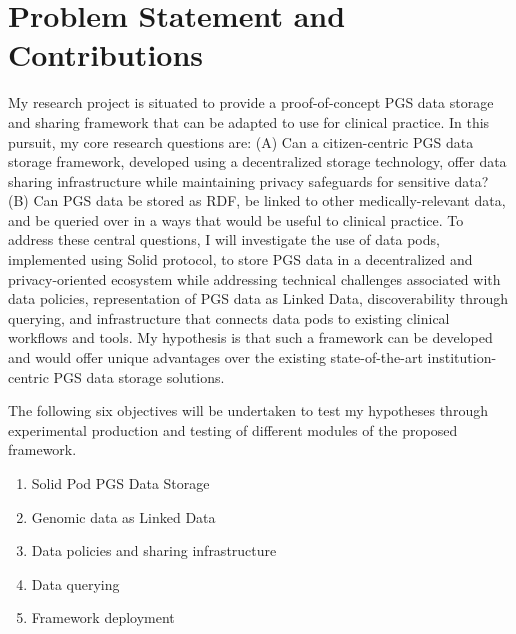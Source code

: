 \documentclass[runningheads]{llncs}
\begin{document}


\section{Problem Statement and Contributions}

My research project is situated to provide a proof-of-concept PGS data storage and sharing framework that can be adapted to use for clinical practice. 
In this pursuit, my core research questions are: 
(A) Can a citizen-centric PGS data storage framework, developed using a decentralized storage technology, offer data sharing infrastructure while maintaining privacy safeguards for sensitive data? 
(B) Can PGS data be stored as RDF, be linked to other medically-relevant data, and be queried over in a ways that would be useful to clinical practice.
To address these central questions, I will investigate the use of data pods, implemented using Solid protocol, to store PGS data in a decentralized and privacy-oriented ecosystem while addressing technical challenges associated with data policies, representation of PGS data as Linked Data, discoverability through querying, and infrastructure that connects data pods to existing clinical workflows and tools. 
My hypothesis is that such a framework can be developed and would offer unique advantages over the existing state-of-the-art institution-centric PGS data storage solutions. 

The following six objectives will be undertaken to test my hypotheses through experimental production and testing of different modules of the proposed framework.
\begin{enumerate}
    \item Solid Pod PGS Data Storage
    \item Genomic data as Linked Data
    \item Data policies and sharing infrastructure
    \item Data querying
    \item Framework deployment
\end{enumerate}
\end{document}
